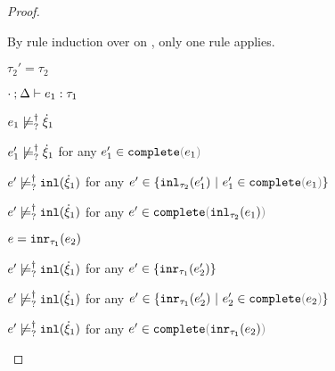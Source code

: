 \begin{proof}
\begin{byCases}
\begin{byCases}
\begin{pfsteps*}
        \end{pfsteps*} 
        By rule induction over  on , only one rule applies.
        \begin{byCases}
          \item[\text{(\ref{rule:TInl})}]
          \begin{pfsteps*}
          \item $\tau_2'=\tau_2$ 
          \item $\cdot \mathbin{;} \Delta \vdash e_1 : \tau_1$  
          \item $e_1 \not\models_{?}^{\dag} \dot{\xi}_1$  
          \item $e_1' \not\models_{?}^{\dag} \dot{\xi}_1$ for any $e_1' \in \expcomplete{e_1}$  
          \item $e' \not\models_{?}^{\dag} \mathtt{inl}(\dot{\xi}_1)$ for any $e' \in \{\hinl{\tau_2}{e_1'} ~\vert~ e_1' \in \expcomplete{e_1}\}$  
          \item $e' \not\models_{?}^{\dag} \mathtt{inl}(\dot{\xi}_1)$ for any $e' \in \expcomplete{\hinl{\tau_2}{e_1}}$ 
          \end{pfsteps*} 
        \end{byCases}
        \item[\text{(\ref{rule:IInr})}] 
        \begin{pfsteps*}
        \item $e=\mathtt{inr}_{\tau_1}({e_2})$ 
        \item $e' \not\models_{?}^{\dag} \mathtt{inl}(\dot{\xi}_1)$ for any $e' \in \{\mathtt{inr}_{\tau_1}({e_2'})\}$  
        \item $e' \not\models_{?}^{\dag} \mathtt{inl}(\dot{\xi}_1)$ for any $e' \in \{\hinr{\tau_1}{e_2'} ~\vert~ e_2' \in \expcomplete{e_2}\}$  
        \item $e' \not\models_{?}^{\dag} \mathtt{inl}(\dot{\xi}_1)$ for any $e' \in \expcomplete{\hinr{\tau_1}{e_2}}$ 
        \end{pfsteps*}
      \end{byCases} 

\end{byCases}
\end{proof}

